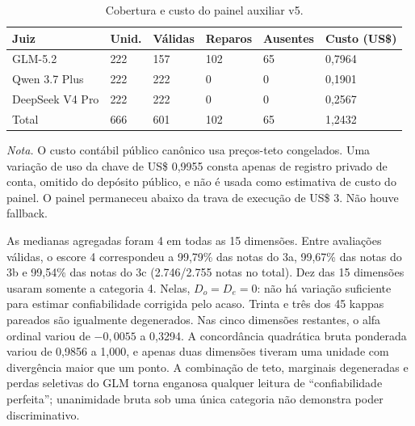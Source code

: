 \documentclass[11pt,a4paper]{article}
\begin{document}
\begin{table}[H]
\centering
\caption{Cobertura e custo do painel auxiliar v5.}
\label{tab:judges}
\small
\setlength{\tabcolsep}{3pt}
\begin{tabularx}{\textwidth}{@{}Y R{1.35cm}R{1.45cm}R{1.35cm}R{1.35cm}R{1.8cm}@{}}
\toprule
Juiz & Unid. & Válidas & Reparos & Ausentes & Custo (US\$) \\
\midrule
GLM-5.2 & 222 & 157 & 102 & 65 & 0,7964 \\
Qwen 3.7 Plus & 222 & 222 & 0 & 0 & 0,1901 \\
DeepSeek V4 Pro & 222 & 222 & 0 & 0 & 0,2567 \\
\midrule
Total & 666 & 601 & 102 & 65 & 1,2432 \\
\bottomrule
\end{tabularx}
\begin{minipage}{\textwidth}\footnotesize\emph{Nota.} O custo contábil público canônico usa preços-teto congelados. Uma variação de uso da chave de US\$ 0,9955 consta apenas de registro privado de conta, omitido do depósito público, e não é usada como estimativa de custo do painel. O painel permaneceu abaixo da trava de execução de US\$ 3. Não houve fallback.
\end{minipage}
\end{table}

As medianas agregadas foram 4 em todas as 15 dimensões. Entre avaliações válidas, o escore 4 correspondeu a 99,79\% das notas do 3a, 99,67\% das notas do 3b e 99,54\% das notas do 3c (2.746/2.755 notas no total). Dez das 15 dimensões usaram somente a categoria 4. Nelas, $D_o=D_e=0$: não há variação suficiente para estimar confiabilidade corrigida pelo acaso. Trinta e três dos 45 kappas pareados são igualmente degenerados. Nas cinco dimensões restantes, o alfa ordinal variou de $-0{,}0055$ a 0,3294. A concordância quadrática bruta ponderada variou de 0,9856 a 1,000, e apenas duas dimensões tiveram uma unidade com divergência maior que um ponto. A combinação de teto, marginais degeneradas e perdas seletivas do GLM torna enganosa qualquer leitura de ``confiabilidade perfeita''; unanimidade bruta sob uma única categoria não demonstra poder discriminativo.
\end{document}
